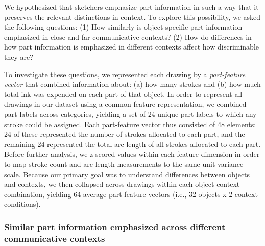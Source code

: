 \documentclass[10pt,letterpaper]{article}
\begin{document}
We hypothesized that sketchers emphasize part information in such a way that it preserves the relevant distinctions in context. 
To explore this possibility, we asked the following questions: 
(1) How similarly is object-specific part information emphasized in close and far communicative contexts? 
(2) How do differences in how part information is emphasized in different contexts affect how discriminable they are?

To investigate these questions, we represented each drawing by a \textit{part-feature vector} that combined information about: (a) how many strokes and (b) how much total ink was expended on each part of that object. 
In order to represent all drawings in our dataset using a common feature representation, we combined part labels across categories, yielding a set of 24 unique part labels to which any stroke could be assigned. 
Each part-feature vector thus consisted of 48 elements: 24 of these represented the number of strokes allocated to each part, and the remaining 24 represented the total arc length of all strokes allocated to each part. 
Before further analysis, we z-scored values within each feature dimension in order to map stroke count and arc length measurements to the same unit-variance scale. 
Because our primary goal was to understand differences between objects and contexts, we then collapsed across drawings within each object-context combination, yielding 64 average part-feature vectors (i.e., 32 objects x 2 context conditions). 

\subsubsection{Similar part information emphasized across different communicative contexts}
\end{document}
